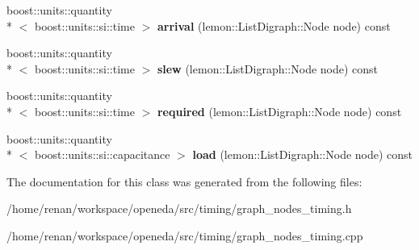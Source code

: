 \begin{DoxyCompactItemize}
\item 
\hypertarget{classophidian_1_1timing_1_1graph__nodes__timing_a6c2ad0796b00f92fdf256c45251b6e26}{boost\-::units\-::quantity\\*
$<$ boost\-::units\-::si\-::time $>$ {\bfseries arrival} (lemon\-::\-List\-Digraph\-::\-Node node) const }\label{classophidian_1_1timing_1_1graph__nodes__timing_a6c2ad0796b00f92fdf256c45251b6e26}

\item 
\hypertarget{classophidian_1_1timing_1_1graph__nodes__timing_a37d8d4224f3119e2afe84d6680742d38}{boost\-::units\-::quantity\\*
$<$ boost\-::units\-::si\-::time $>$ {\bfseries slew} (lemon\-::\-List\-Digraph\-::\-Node node) const }\label{classophidian_1_1timing_1_1graph__nodes__timing_a37d8d4224f3119e2afe84d6680742d38}

\item 
\hypertarget{classophidian_1_1timing_1_1graph__nodes__timing_a63a5387edc2e08efbc86291cb8815b3d}{boost\-::units\-::quantity\\*
$<$ boost\-::units\-::si\-::time $>$ {\bfseries required} (lemon\-::\-List\-Digraph\-::\-Node node) const }\label{classophidian_1_1timing_1_1graph__nodes__timing_a63a5387edc2e08efbc86291cb8815b3d}

\item 
\hypertarget{classophidian_1_1timing_1_1graph__nodes__timing_a080e303f4de1e71effda4c9ae2fa4094}{boost\-::units\-::quantity\\*
$<$ boost\-::units\-::si\-::capacitance $>$ {\bfseries load} (lemon\-::\-List\-Digraph\-::\-Node node) const }\label{classophidian_1_1timing_1_1graph__nodes__timing_a080e303f4de1e71effda4c9ae2fa4094}

\end{DoxyCompactItemize}


The documentation for this class was generated from the following files\-:\begin{DoxyCompactItemize}
\item 
/home/renan/workspace/openeda/src/timing/graph\-\_\-nodes\-\_\-timing.\-h\item 
/home/renan/workspace/openeda/src/timing/graph\-\_\-nodes\-\_\-timing.\-cpp\end{DoxyCompactItemize}
